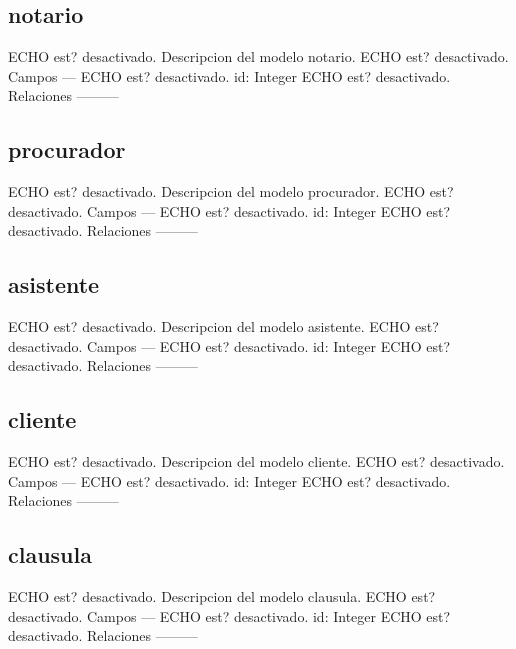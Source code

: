 \documentclass[letterpaper,10pt,spanish]{sphinxmanual}
\begin{document}
\sphinxstepscope


\subsection{notario}
\label{\detokenize{modelos/notario:notario}}\label{\detokenize{modelos/notario::doc}}
\sphinxAtStartPar
ECHO est? desactivado.
Descripcion del modelo notario.
ECHO est? desactivado.
Campos
—\textendash{}
ECHO est? desactivado.
\sphinxhyphen{} id: Integer
ECHO est? desactivado.
Relaciones
———\sphinxhyphen{}

\sphinxstepscope


\subsection{procurador}
\label{\detokenize{modelos/procurador:procurador}}\label{\detokenize{modelos/procurador::doc}}
\sphinxAtStartPar
ECHO est? desactivado.
Descripcion del modelo procurador.
ECHO est? desactivado.
Campos
—\textendash{}
ECHO est? desactivado.
\sphinxhyphen{} id: Integer
ECHO est? desactivado.
Relaciones
———\sphinxhyphen{}

\sphinxstepscope


\subsection{asistente}
\label{\detokenize{modelos/asistente:asistente}}\label{\detokenize{modelos/asistente::doc}}
\sphinxAtStartPar
ECHO est? desactivado.
Descripcion del modelo asistente.
ECHO est? desactivado.
Campos
—\textendash{}
ECHO est? desactivado.
\sphinxhyphen{} id: Integer
ECHO est? desactivado.
Relaciones
———\sphinxhyphen{}

\sphinxstepscope


\subsection{cliente}
\label{\detokenize{modelos/cliente:cliente}}\label{\detokenize{modelos/cliente::doc}}
\sphinxAtStartPar
ECHO est? desactivado.
Descripcion del modelo cliente.
ECHO est? desactivado.
Campos
—\textendash{}
ECHO est? desactivado.
\sphinxhyphen{} id: Integer
ECHO est? desactivado.
Relaciones
———\sphinxhyphen{}

\sphinxstepscope


\subsection{clausula}
\label{\detokenize{modelos/clausula:clausula}}\label{\detokenize{modelos/clausula::doc}}
\sphinxAtStartPar
ECHO est? desactivado.
Descripcion del modelo clausula.
ECHO est? desactivado.
Campos
—\textendash{}
ECHO est? desactivado.
\sphinxhyphen{} id: Integer
ECHO est? desactivado.
Relaciones
———\sphinxhyphen{}
\end{document}
